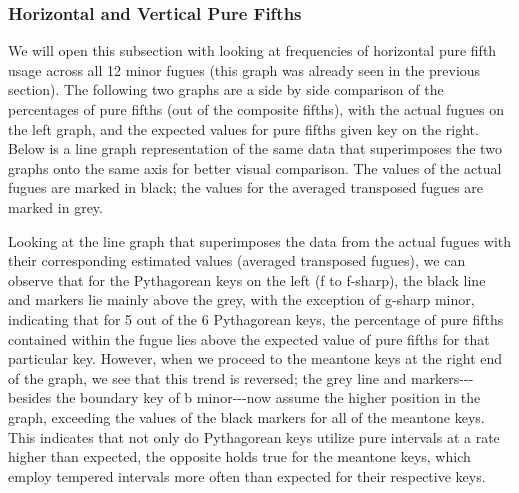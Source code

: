 \subsubsection{Horizontal and Vertical Pure
Fifths}\label{horizontal-and-vertical-pure-fifths}

We will open this subsection with looking at frequencies of horizontal
pure fifth usage across all 12 minor fugues (this graph was already seen
in the previous section). The following two graphs are a side by side
comparison of the percentages of pure fifths (out of the composite
fifths), with the actual fugues on the left graph, and the expected
values for pure fifths given key on the right. Below is a line graph
representation of the same data that superimposes the two graphs onto
the same axis for better visual comparison. The values of the actual
fugues are marked in black; the values for the averaged transposed
fugues are marked in grey.


    \begin{center}
    \end{center}
    


    \begin{center}
    \end{center}
    
    Looking at the line graph that superimposes the data from the actual
fugues with their corresponding estimated values (averaged transposed
fugues), we can observe that for the Pythagorean keys on the left (f to
f-sharp), the black line and markers lie mainly above the grey, with the
exception of g-sharp minor, indicating that for 5 out of the 6
Pythagorean keys, the percentage of pure fifths contained within the
fugue lies above the expected value of pure fifths for that particular
key. However, when we proceed to the meantone keys at the right end of
the graph, we see that this trend is reversed; the grey line and
markers-\/-\/-besides the boundary key of b minor-\/-\/-now assume the
higher position in the graph, exceeding the values of the black markers
for all of the meantone keys. This indicates that not only do
Pythagorean keys utilize pure intervals at a rate higher than expected,
the opposite holds true for the meantone keys, which employ tempered
intervals more often than expected for their respective keys.

